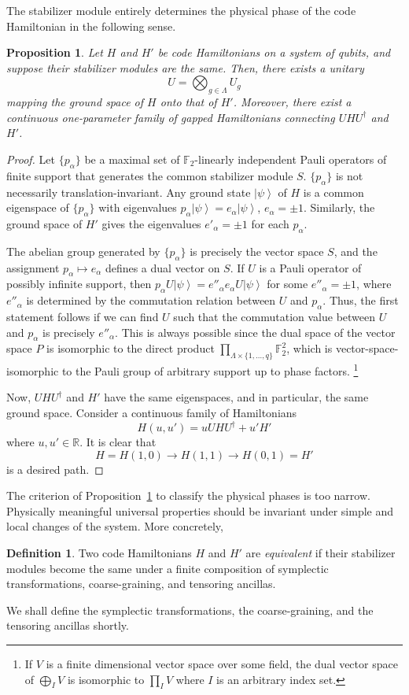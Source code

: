 \documentclass[letterpaper,12pt]{amsart}
\newtheorem{prop}[lem]{Proposition}
\theoremstyle{definition} \newtheorem{defn}{Definition}
\theoremstyle{definition} \newtheorem{rem}{Remark}
\theoremstyle{definition} \newtheorem{example}{Example}
\newcommand{\ket}[1]{\left| {#1} \right\rangle}
\newcommand{\FF}{\mathbb{F}}
\begin{document}
The stabilizer module entirely determines
the physical phase of the code Hamiltonian
in the following sense.
\begin{prop}
Let $H$ and $H'$ be code Hamiltonians on a system of qubits,
and suppose their stabilizer modules are the same.
Then, there exists a unitary
\[
 U = \bigotimes_{g \in \Lambda} U_{g}
\]
mapping the ground space of $H$ onto that of $H'$.
Moreover, there exist a continuous one-parameter family of gapped Hamiltonians
connecting $U H U^\dagger$ and $H'$.
\label{prop:associated-module-invariance}
\end{prop}
\begin{proof}
Let $\{ p_\alpha \}$ be a maximal set of $\FF_2$-linearly independent Pauli operators of finite support
that generates the common stabilizer module $S$.
$\{p_\alpha\}$ is not necessarily translation-invariant.
Any ground state $\ket \psi$ of $H$ is a common eigenspace of $\{p_\alpha\}$
with eigenvalues $p_\alpha \ket \psi = e_\alpha \ket \psi$, $e_\alpha = \pm 1$.
Similarly, the ground space of $H'$ gives the eigenvalues $e'_\alpha = \pm 1$ for each $p_\alpha$.

The abelian group generated by $\{ p_\alpha \}$ is precisely the vector space $S$,
and the assignment $p_\alpha \mapsto e_\alpha$ defines a dual vector on $S$.
If $U$ is a Pauli operator of possibly infinite support,
then $ p_\alpha U \ket \psi = e''_\alpha e_\alpha U \ket \psi$ for some $e''_\alpha = \pm 1$,
where $e''_\alpha$ is determined by the commutation relation between $U$ and $p_\alpha$.
Thus, the first statement follows if we can find $U$
such that the commutation value between $U$ and $p_\alpha$ is precisely $e''_\alpha$.
This is always possible since the dual space of the vector space $P$
is isomorphic to the direct product $\prod _{\Lambda \times \{1,\ldots, q\}} \FF_2^2$,
which is vector-space-isomorphic to the Pauli group of arbitrary support up to phase factors.%
%
\footnote{{If $V$ is a finite dimensional vector space over some field,%
the dual vector space of $\bigoplus_I V$ %
is isomorphic to $\prod_{I} V$ where $I$ is an arbitrary index set.}}
%

Now, $U H U^\dagger$ and $H'$ have the same eigenspaces, and in particular, the same ground space.
Consider a continuous family of Hamiltonians
\[
H(u,u') = u U H U^\dagger + u' H'
\]
where $u,u' \in \mathbb{R}$.
It is clear that
\[
 H = H(1,0) \to H(1,1) \to H(0,1) = H'
\]
is a desired path.
\end{proof}

The criterion of Proposition~\ref{prop:associated-module-invariance}
to classify the physical phases is too narrow.
Physically meaningful universal properties should be invariant
under simple and local changes of the system. More concretely,
\begin{defn}
Two code Hamiltonians $H$ and $H'$ are {\em equivalent} if
their stabilizer modules become the same under a finite composition
of symplectic transformations, coarse-graining, and tensoring ancillas.
\label{defn:equiv-H}
\end{defn}
We shall define the symplectic transformations,
the coarse-graining, and the tensoring ancillas shortly.
\end{document}
